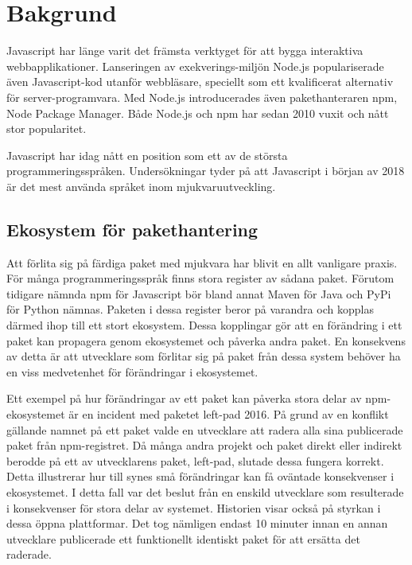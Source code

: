 \section{Bakgrund}
\label{sec:joel_o-background}

Javascript har länge varit det främsta verktyget för att bygga interaktiva webbapplikationer. Lanseringen av exekverings-miljön Node.js\cite{node-about} populariserade även Javascript-kod utanför webbläsare, speciellt som ett kvalificerat alternativ för server-programvara. Med Node.js introducerades även pakethanteraren npm, Node Package Manager. Både Node.js och npm har sedan 2010 vuxit och nått stor popularitet.\cite{node-timeline}

Javascript har idag nått en position som ett av de största programmeringsspråken. Undersökningar tyder på att Javascript i början av 2018 är det mest använda språket inom mjukvaruutveckling.\cite{githut}\cite{so-survey}

\subsection{Ekosystem för pakethantering}
Att förlita sig på färdiga paket med mjukvara har blivit en allt vanligare praxis. För många programmeringsspråk finns stora register av sådana paket. Förutom tidigare nämnda npm för Javascript bör bland annat Maven för Java och PyPi för Python nämnas. Paketen i dessa register beror på varandra och kopplas därmed ihop till ett stort ekosystem. Dessa kopplingar gör att en förändring i ett paket kan propagera genom ekosystemet och påverka andra paket. En konsekvens av detta är att utvecklare som förlitar sig på paket från dessa system behöver ha en viss medvetenhet för förändringar i ekosystemet.\cite{Henry2017}

Ett exempel på hur förändringar av ett paket kan påverka stora delar av npm-ekosystemet är en incident med paketet left-pad 2016. På grund av en konflikt gällande namnet på ett paket valde en utvecklare att radera alla sina publicerade paket från npm-registret. Då många andra projekt och paket direkt eller indirekt berodde på ett av utvecklarens paket, left-pad, slutade dessa fungera korrekt. Detta illustrerar hur till synes små förändringar kan få oväntade konsekvenser i ekosystemet. I detta fall var det beslut från en enskild utvecklare som resulterade i konsekvenser för stora delar av systemet. Historien visar också på styrkan i dessa öppna plattformar. Det tog nämligen endast 10 minuter innan en annan utvecklare publicerade ett funktionellt identiskt paket för att ersätta det raderade.\cite{npm-left-pad}

